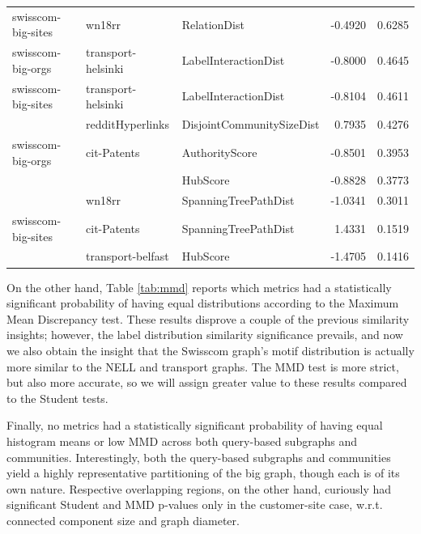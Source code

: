 \begin{table}[H]
\begin{adjustbox}{width=0.75\columnwidth}
\begin{tabular}{lllrr}
swisscom-big-sites & wn18rr & RelationDist & -0.4920 &       0.6285 \\
swisscom-big-orgs & transport-helsinki & LabelInteractionDist & -0.8000 &       0.4645 \\
swisscom-big-sites & transport-helsinki & LabelInteractionDist & -0.8104 &       0.4611 \\
                   & redditHyperlinks & DisjointCommunitySizeDist &  0.7935 &       0.4276 \\
swisscom-big-orgs & cit-Patents & AuthorityScore & -0.8501 &       0.3953 \\
                   &                   & HubScore & -0.8828 &       0.3773 \\
                   & wn18rr & SpanningTreePathDist & -1.0341 &       0.3011 \\
swisscom-big-sites & cit-Patents & SpanningTreePathDist &  1.4331 &       0.1519 \\
                   & transport-belfast & HubScore & -1.4705 &       0.1416 \\
\bottomrule
\end{tabular}
\end{adjustbox}
\end{table}

On the other hand, Table \ref{tab:mmd} reports which metrics had a statistically significant probability of having equal distributions according to the Maximum Mean Discrepancy test. These results disprove a couple of the previous similarity insights; however, the label distribution similarity significance prevails, and now we also obtain the insight that the Swisscom graph's motif distribution is actually more similar to the NELL and transport graphs. The MMD test is more strict, but also more accurate, so we will assign greater value to these results compared to the Student tests.

Finally, no metrics had a statistically significant probability of having equal histogram means or low MMD across both query-based subgraphs and communities. Interestingly, both the query-based subgraphs and communities yield a highly representative partitioning of the big graph, though each is of its own nature. Respective overlapping regions, on the other hand, curiously had significant Student and MMD p-values only in the customer-site case, w.r.t. connected component size and graph diameter.


